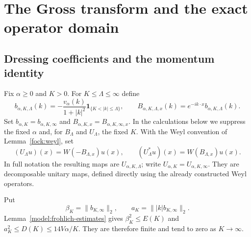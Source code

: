 \documentclass[11pt,a4paper]{article}
\theoremstyle{definition}
\theoremstyle{remark}
\begin{document}
\section{The Gross transform and the exact operator domain}
\label{sec:gross}

\subsection{Dressing coefficients and the momentum identity}

Fix $\alpha\geq0$ and $K>0$. For $K\leq\Lambda\leq\infty$ define
\[
 b_{\alpha,K,\Lambda}(k)=-\frac{v_\alpha(k)}{1+|k|^2}
                 \mathbf1_{\{K<|k|\leq\Lambda\}},\qquad
 B_{\alpha,K,\Lambda,x}(k)=e^{-ik\cdot x}b_{\alpha,K,\Lambda}(k).
\]
Set $b_{\alpha,K}=b_{\alpha,K,\infty}$ and
$B_{\alpha,K,x}=B_{\alpha,K,\infty,x}$. In the calculations below we
suppress the fixed $\alpha$ and, for $B_\Lambda$ and $U_\Lambda$, the
fixed $K$. With the Weyl convention of
Lemma~\ref{fock:weyl}, set
\[
 (U_\Lambda u)(x)=W(-B_{\Lambda,x})u(x),\qquad
 (U_\Lambda^*u)(x)=W(B_{\Lambda,x})u(x).
\]
In full notation the resulting maps are $U_{\alpha,K,\Lambda}$;
write $U_{\alpha,K}=U_{\alpha,K,\infty}$. They are decomposable
unitary maps, defined directly using the already constructed Weyl
operators.

Put
\[
 \beta_K=\|b_{K,\infty}\|_2,\qquad
 a_K=\||k|b_{K,\infty}\|_2.
\]
Lemma~\ref{model:frohlich-estimates} gives
$\beta_K^2\leq E(K)$ and $a_K^2\leq D(K)\leq14V\alpha/K$.
They are therefore finite and tend to zero as $K\to\infty$.
\end{document}
